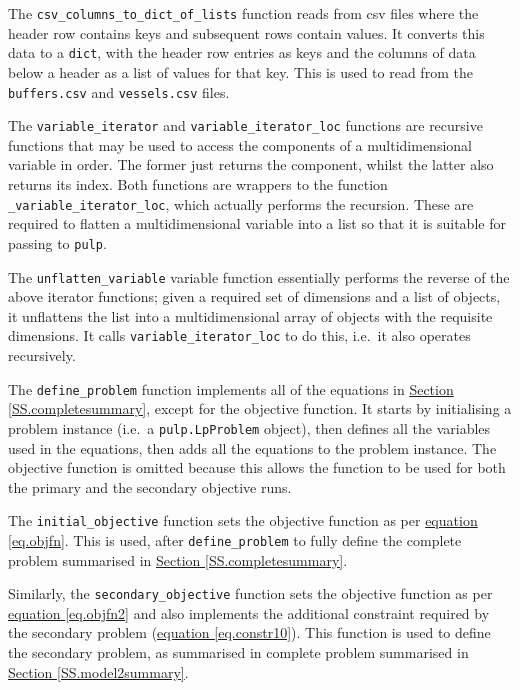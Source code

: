 The \texttt{csv\_columns\_to\_dict\_of\_lists} function reads from csv files
where the header row contains keys and subsequent rows contain values.
It converts this data to a \texttt{dict}, with the header row entries as keys
and the columns of data below a header as a list of values for that key.
This is used to read from the \texttt{buffers.csv} and \texttt{vessels.csv}
files.

The \texttt{variable\_iterator} and \texttt{variable\_iterator\_loc}
functions are recursive functions that may be used to access the components of
a multidimensional variable in order.
The former just returns the component, whilst the latter also returns its
index.
Both functions are wrappers to the function \texttt{\_variable\_iterator\_loc},
which actually performs the recursion.
These are required to flatten a multidimensional variable into a list so that
it is suitable for passing to \texttt{pulp}.

The \texttt{unflatten\_variable} variable function essentially performs the
reverse of the above iterator functions; given a required set of dimensions
and a list of objects, it unflattens the list into a multidimensional array of
objects with the requisite dimensions.
It calls \texttt{variable\_iterator\_loc} to do this, i.e.\ it also operates
recursively.

The \texttt{define\_problem} function implements all of the equations in
\hyperref[SS.completesummary]{Section \ref*{SS.completesummary}}, except for
the objective function. It starts by initialising a problem 
instance (i.e.\ a \texttt{pulp.LpProblem} object), then defines all the
variables used in the equations, then adds all the equations to the problem
instance. The objective function is omitted because this allows the function to
be used for both the primary and the secondary objective runs.

The \texttt{initial\_objective} function sets the objective function as per
\hyperref[eq.objfn]{equation \ref*{eq.objfn}}.  This is used, after
\texttt{define\_problem} to fully define the complete problem summarised in 
\hyperref[SS.completesummary]{Section \ref*{SS.completesummary}}.

Similarly, the \texttt{secondary\_objective} function sets the objective
function as per \hyperref[eq.objfn2]{equation \ref*{eq.objfn2}} and also
implements the additional constraint required by the secondary problem
(\hyperref[eq.constr10]{equation \ref*{eq.constr10}}).
This function is used to define the secondary problem, as summarised in
complete problem summarised in 
\hyperref[SS.model2summary]{Section \ref*{SS.model2summary}}.

